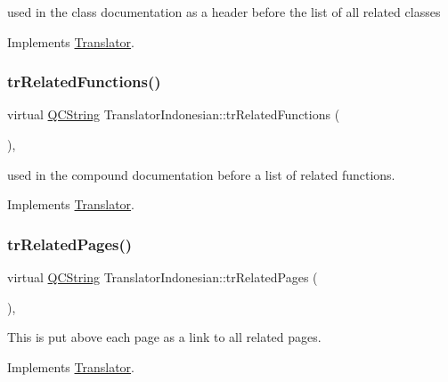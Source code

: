 used in the class documentation as a header before the list of all related classes 

Implements \mbox{\hyperlink{class_translator}{Translator}}.

\mbox{\label{class_translator_indonesian_ac8c53aee48e563a000db6f058ea33bf0}} 
\subsubsection{\texorpdfstring{trRelatedFunctions()}{trRelatedFunctions()}}
{\footnotesize\ttfamily virtual \mbox{\hyperlink{class_q_c_string}{Q\+C\+String}} Translator\+Indonesian\+::tr\+Related\+Functions (\begin{DoxyParamCaption}{ }\end{DoxyParamCaption})\hspace{0.3cm}{\ttfamily [inline]}, {\ttfamily [virtual]}}

used in the compound documentation before a list of related functions. 

Implements \mbox{\hyperlink{class_translator}{Translator}}.

\mbox{\label{class_translator_indonesian_a7c31360beb4ea927cdd5f053a65245e7}} 
\subsubsection{\texorpdfstring{trRelatedPages()}{trRelatedPages()}}
{\footnotesize\ttfamily virtual \mbox{\hyperlink{class_q_c_string}{Q\+C\+String}} Translator\+Indonesian\+::tr\+Related\+Pages (\begin{DoxyParamCaption}{ }\end{DoxyParamCaption})\hspace{0.3cm}{\ttfamily [inline]}, {\ttfamily [virtual]}}

This is put above each page as a link to all related pages. 

Implements \mbox{\hyperlink{class_translator}{Translator}}.

\mbox{\label{class_translator_indonesian_ad3bef44b2475884ec435d3a87a40d4bd}} 
